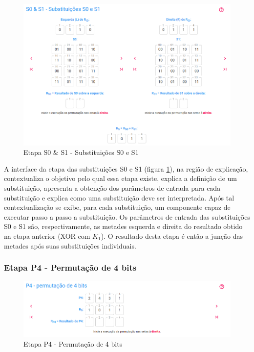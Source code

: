 \begin{figure}[H]
    \centering
    \caption{Etapa S0 \& S1 - Substituições S0 e S1}
    \label{fig:uis0s1}
    \includegraphics[width=1\linewidth]{UI/UIS0S1.png}
\end{figure}

A interface da etapa das substituições S0 e S1 (figura \ref{fig:uis0s1}), na região de explicação, contextualiza o objetivo pelo qual essa etapa existe, explica a definição de um substituição, apresenta a obtenção dos parâmetros de entrada para cada substituição e explica como uma substituição deve ser interpretada. Após tal contextualização se exibe, para cada substituição, um componente capaz de executar passo a passo a substituição. Os parâmetros de entrada das substituições S0 e S1 são, respectivamente, as metades esquerda e direita do resultado obtido na etapa anterior (XOR com \(K_1\)). O resultado desta etapa é então a junção das metades após suas substituições individuais.

\subsubsection{Etapa P4 - Permutação de 4 bits}

\begin{figure}[H]
    \centering
    \caption{Etapa P4 - Permutação de 4 bits}
    \label{fig:uip4}
    \includegraphics[width=1\linewidth]{UI/UIP4.png}
\end{figure}

